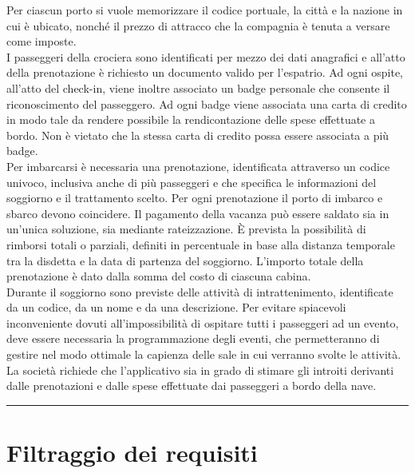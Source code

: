 \documentclass[a4paper, titlepage]{report}
\begin{document}
\begin{linenumbers}
	\noindent
	Per ciascun porto si vuole memorizzare il codice portuale, la città e la nazione in cui è ubicato, nonché il prezzo di attracco che la compagnia è tenuta a versare come imposte. \\
	
	\noindent
	I passeggeri della crociera sono identificati per mezzo dei dati anagrafici e all'atto della prenotazione è richiesto un documento valido per l'espatrio. Ad ogni ospite, all'atto del check-in, viene inoltre associato un badge personale che consente il riconoscimento del passeggero. Ad ogni badge viene associata una carta di credito in modo tale da rendere possibile la rendicontazione delle spese effettuate a bordo. Non è vietato che la stessa carta di credito possa essere associata a più badge. \\
	
	\noindent
	Per imbarcarsi è necessaria una prenotazione, identificata attraverso un codice univoco, inclusiva anche di più passeggeri e che specifica le informazioni del soggiorno e il trattamento scelto. Per ogni prenotazione il porto di imbarco e sbarco devono coincidere. Il pagamento della vacanza può essere saldato sia in un'unica soluzione, sia mediante rateizzazione. È prevista la possibilità di rimborsi totali o parziali, definiti in percentuale in base alla distanza temporale tra la disdetta e la data di partenza del soggiorno. L'importo totale della prenotazione è dato dalla somma del costo di ciascuna cabina. \\
	
	\noindent
	Durante il soggiorno sono previste delle attività di intrattenimento, identificate da un codice, da un nome e da una descrizione. Per evitare spiacevoli inconveniente dovuti all'impossibilità di ospitare tutti i passeggeri ad un evento, deve essere necessaria la programmazione degli eventi, che permetteranno di gestire nel modo ottimale la capienza delle sale in cui verranno svolte le attività. \\
	
	\noindent
	La società richiede che l'applicativo sia in grado di stimare gli introiti derivanti dalle prenotazioni e dalle spese effettuate dai passeggeri a bordo della nave. 	

	\end{linenumbers}

	\vspace{0.2cm}
	\noindent\rule{\textwidth}{0.4pt}
	
\section*{Filtraggio dei requisiti}
\end{document}

